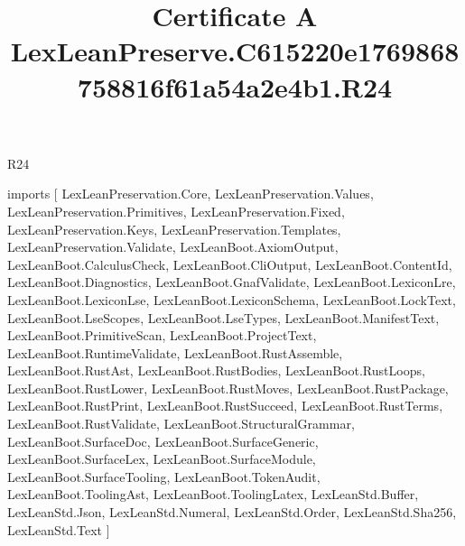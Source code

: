 \begin{lexlean}{R24}
\title{Certificate A LexLeanPreserve.C615220e1769868758816f61a54a2e4b1.R24}
\begin{coremodule}
imports [
  LexLeanPreservation.Core,
  LexLeanPreservation.Values,
  LexLeanPreservation.Primitives,
  LexLeanPreservation.Fixed,
  LexLeanPreservation.Keys,
  LexLeanPreservation.Templates,
  LexLeanPreservation.Validate,
  LexLeanBoot.AxiomOutput,
  LexLeanBoot.CalculusCheck,
  LexLeanBoot.CliOutput,
  LexLeanBoot.ContentId,
  LexLeanBoot.Diagnostics,
  LexLeanBoot.GnafValidate,
  LexLeanBoot.LexiconLre,
  LexLeanBoot.LexiconLse,
  LexLeanBoot.LexiconSchema,
  LexLeanBoot.LockText,
  LexLeanBoot.LseScopes,
  LexLeanBoot.LseTypes,
  LexLeanBoot.ManifestText,
  LexLeanBoot.PrimitiveScan,
  LexLeanBoot.ProjectText,
  LexLeanBoot.RuntimeValidate,
  LexLeanBoot.RustAssemble,
  LexLeanBoot.RustAst,
  LexLeanBoot.RustBodies,
  LexLeanBoot.RustLoops,
  LexLeanBoot.RustLower,
  LexLeanBoot.RustMoves,
  LexLeanBoot.RustPackage,
  LexLeanBoot.RustPrint,
  LexLeanBoot.RustSucceed,
  LexLeanBoot.RustTerms,
  LexLeanBoot.RustValidate,
  LexLeanBoot.StructuralGrammar,
  LexLeanBoot.SurfaceDoc,
  LexLeanBoot.SurfaceGeneric,
  LexLeanBoot.SurfaceLex,
  LexLeanBoot.SurfaceModule,
  LexLeanBoot.SurfaceTooling,
  LexLeanBoot.TokenAudit,
  LexLeanBoot.ToolingAst,
  LexLeanBoot.ToolingLatex,
  LexLeanStd.Buffer,
  LexLeanStd.Json,
  LexLeanStd.Numeral,
  LexLeanStd.Order,
  LexLeanStd.Sha256,
  LexLeanStd.Text
]


\end{coremodule}
\end{lexlean}
